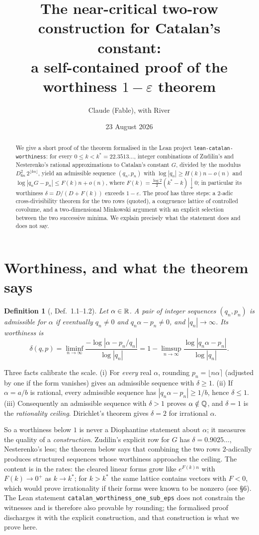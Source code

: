 \documentclass[11pt]{amsart}
\title{The near-critical two-row construction for Catalan's constant:\\ a self-contained proof of the worthiness $1-\varepsilon$ theorem}
\author{Claude (Fable), with River}
\date{23 August 2026}
\newtheorem{definition}[theorem]{Definition}
\theoremstyle{remark}
\begin{document}
\begin{abstract}
We give a short proof of the theorem formalised in the Lean project \texttt{lean-catalan-worthiness}: for every $0\le k<k^*=22.3513\ldots$, integer combinations of Zudilin's and Nesterenko's rational approximations to Catalan's constant $G$, divided by the modulus $D_{6n}^2\,2^{\lfloor kn\rfloor}$, yield an admissible sequence $(q_n,p_n)$ with $\log|q_n|\ge H(k)n-o(n)$ and $\log|q_nG-p_n|\le F(k)n+o(n)$, where $F(k)=\tfrac{\log2}{2}(k^*-k)\downarrow0$; in particular its worthiness $\delta=D/(D+F(k))$ exceeds $1-\varepsilon$. The proof has three steps: a $2$-adic cross-divisibility theorem for the two rows (quoted), a congruence lattice of controlled covolume, and a two-dimensional Minkowski argument with an explicit selection between the two successive minima. We explain precisely what the statement does and does not say.
\end{abstract}
\maketitle

\section{Worthiness, and what the theorem says}
\begin{definition}[\cite{Lean}, Def.~1.1--1.2]
Let $\alpha\in\mathbb R$. A pair of integer sequences $(q_n,p_n)$ is \emph{admissible} for $\alpha$ if eventually $q_n\ne0$ and $q_n\alpha-p_n\ne0$, and $|q_n|\to\infty$. Its \emph{worthiness} is
\[\delta(q,p)=\liminf_{n\to\infty}\frac{-\log|\alpha-p_n/q_n|}{\log|q_n|}=1-\limsup_{n\to\infty}\frac{\log|q_n\alpha-p_n|}{\log|q_n|}.\]
\end{definition}
Three facts calibrate the scale. (i) For \emph{every} real $\alpha$, rounding $p_n=\lfloor n\alpha\rceil$ (adjusted by one if the form vanishes) gives an admissible sequence with $\delta\ge1$. (ii) If $\alpha=a/b$ is rational, every admissible sequence has $|q_n\alpha-p_n|\ge1/b$, hence $\delta\le1$. (iii) Consequently an admissible sequence with $\delta>1$ proves $\alpha\notin\mathbb Q$, and $\delta=1$ is the \emph{rationality ceiling}. Dirichlet's theorem gives $\delta=2$ for irrational $\alpha$.

So a worthiness below $1$ is never a Diophantine statement about $\alpha$; it measures the quality of a \emph{construction}. Zudilin's explicit row for $G$ \cite{Zud} has $\delta=0.9025\ldots$, Nesterenko's \cite{Nes} less; the theorem below says that combining the two rows $2$-adically produces structured sequences whose worthiness approaches the ceiling. The content is in the rates: the cleared linear forms grow like $e^{F(k)n}$ with $F(k)\to0^+$ as $k\to k^*$; for $k>k^*$ the same lattice contains vectors with $F<0$, which would prove irrationality if their forms were known to be nonzero (see \S6). The Lean statement \texttt{catalan\_worthiness\_one\_sub\_eps} does not constrain the witnesses and is therefore also provable by rounding; the formalised proof discharges it with the explicit construction, and that construction is what we prove here.
\end{document}
